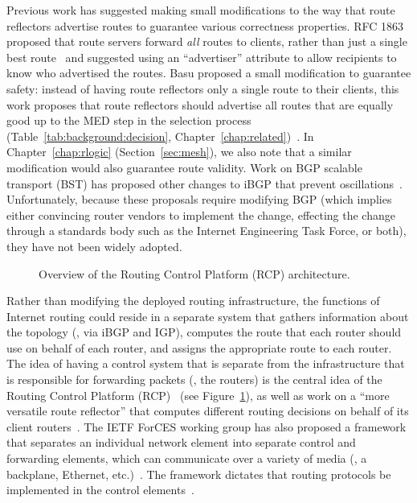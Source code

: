 Previous work has suggested making small modifications to the way that
route reflectors advertise routes to guarantee various correctness
properties.  RFC 1863 proposed that route servers forward {\em all\/}
routes to clients, rather than just a single best
route~\cite{rfc1863} and suggested using an ``advertiser''
attribute to allow recipients to know who advertised the routes.  Basu
\ea proposed a small modification to guarantee safety: instead
of having route reflectors only a single route to their clients, this
work proposes that route reflectors
should advertise all routes that are equally good up to the MED step in
the selection process (Table~\ref{tab:background:decision},
Chapter~\ref{chap:related})~\cite{Basu2002}.  In
Chapter~\ref{chap:rlogic} (Section~\ref{sec:mesh}), we also note that a
similar modification 
would also guarantee route validity.  Work on
BGP scalable transport (BST) has proposed other changes to iBGP that prevent
oscillations~\cite{Jacobson2003}.  Unfortunately, because these
proposals require modifying BGP (which implies either convincing router
vendors to implement the change, effecting the change through a standards
body such as the Internet Engineering Task Force, or both), they have
not been widely adopted.

\begin{figure}
\centering
{}\hfill
{}
\caption[Overview of Routing Control Platform]{Overview of the Routing
Control Platform (RCP) architecture.}
\label{fig:rcp}
\end{figure}

Rather than modifying the deployed routing infrastructure, the functions
of Internet routing could reside in a separate system that gathers
information about the topology (\eg, via iBGP and IGP), computes the
route that each router should use on behalf of each router, and assigns
the appropriate route to each router.  The idea of having a control
system that is separate from the infrastructure that is responsible for
forwarding packets (\ie, the routers) is the central idea of the 
Routing Control Platform (RCP)~\cite{caesar2004,feamster:fdna2004}
(see Figure~\ref{fig:rcp}), as well as work on a ``more versatile
route reflector'' that computes different routing decisions on behalf of
its client routers~\cite{id-versatile-rr}.  The IETF ForCES working
group has also proposed a framework that separates an individual
network element into separate control and forwarding elements, which can
communicate over a variety of media (\eg, a backplane, Ethernet,
etc.)~\cite{forces-wg}.  The framework dictates that routing protocols
be implemented in the control elements~\cite{rfc3746}.

